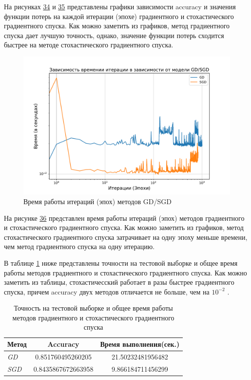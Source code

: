 \documentclass[14pt]{extarticle}
\begin{document}
На рисунках \hyperref[fig:exp_6_acc]{34} и \hyperref[fig:exp_6_loss]{35} представлены графики зависимости accuracy и значения функции потерь на каждой итерации (эпохе) градиентного и  стохастического градиентного спуска. Как можно заметить из графиков, метод градиентного спуска дает лучшую точность, однако, значение функции потерь сходится быстрее на методе стохастического градиентного спуска.

\begin{figure}[H]
    \centering
    \includegraphics[width=0.7\linewidth]
    {exp_6_time.pdf}
    \caption{Время работы итераций (эпох) методов GD/SGD}
    \label{fig:exp_6_time}
\end{figure}

На рисунке \hyperref[fig:exp_6_acc]{36} представлен время работы итераций (эпох) методов градиентного и стохастического градиентного спуска. Как можно заметить из графиков, метод стохастического градиентного спуска затрачивает на одну эпоху меньше времени, чем метод градиентного спуска на одну итерацию.

В таблице \hyperref[tab:exp_6_acc_time]{1} ниже представлены точности на тестовой выборке и общее время работы методов градиентного и стохастического градиентного спуска. Как можно заметить из таблицы, стохастичесский работает в разы быстрее градиентного спуска, причем accuracy двух методов отличается не больше, чем на $10^{-2}$ .

\begin{table}[H]
    \centering
    \begin{tabular}{|l|c|c|}
        \hline
        Метод & Accuracy & Время выполнения(сек.) \\ \hline
        \textit{GD} & 0.851760495260205 & 21.50232481956482 \\ \hline
        \textit{SGD} & 0.8435867672663958 & 9.866184711456299 \\ \hline
    \end{tabular}
    \caption{Точность на тестовой выборке и общее время работы методов градиентного и стохастического градиентного спуска}
    \label{tab:exp_6_acc_time}
\end{table}
\end{document}
